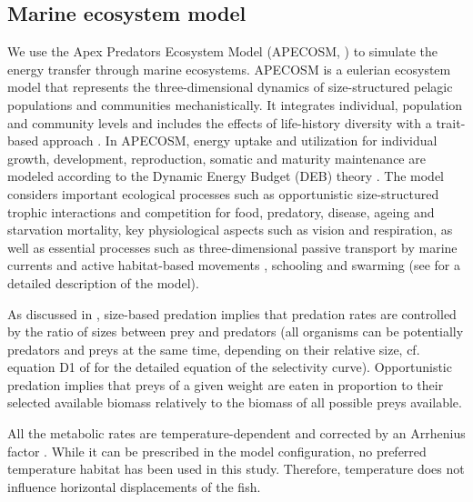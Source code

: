 
\subsection{Marine ecosystem model}
\label{sec:apecosm}

We use the Apex Predators Ecosystem Model (APECOSM, \citealp{mauryModelingEnvironmentalEffects2007, mauryOverviewAPECOSMSpatialized2010}) to simulate the energy transfer through marine ecosystems. 
APECOSM is a eulerian ecosystem model that represents the three-dimensional dynamics of size-structured pelagic populations and communities mechanistically. It integrates individual, population and community levels and includes the effects of life-history diversity with a trait-based approach \citep{mauryIndividualsPopulationsCommunities2013}. In APECOSM, energy uptake and utilization for individual growth, development, reproduction, somatic and maturity maintenance are modeled according to the Dynamic Energy Budget (DEB) theory \citep{koojmanDynamicEnergyBudget2010}. The model considers important ecological processes such as opportunistic size-structured trophic interactions and competition for food, predatory, disease, ageing and starvation mortality, key physiological aspects such as vision and respiration, as well as essential processes such as three-dimensional passive transport by marine currents and active habitat-based movements \citep{faugerasAdvectiondiffusionreactionSizestructuredFish2005}, schooling and swarming (see \citealp{mauryModelingEnvironmentalEffects2007, mauryIndividualsPopulationsCommunities2013, mauryCanSchoolingRegulate2017} for a detailed description of the model). 

As discussed in \cite{mauryIndividualsPopulationsCommunities2013}, size-based predation implies that predation rates are controlled by the ratio of sizes
between prey and predators (all organisms can be potentially predators and
preys at the same time, depending on their relative size, cf. equation D1 of \cite{mauryIndividualsPopulationsCommunities2013} for the detailed equation of the selectivity curve). Opportunistic predation implies that preys
of a given weight are eaten in proportion to their selected
available biomass relatively to the biomass of all possible preys
available.

All the metabolic rates are temperature-dependent and corrected by an Arrhenius factor \citep{mauryModelingEnvironmentalEffects2007, mauryIndividualsPopulationsCommunities2013}. While it can be prescribed in the model configuration, no preferred temperature habitat has been used in this study. Therefore, temperature does not influence horizontal displacements of the fish.


